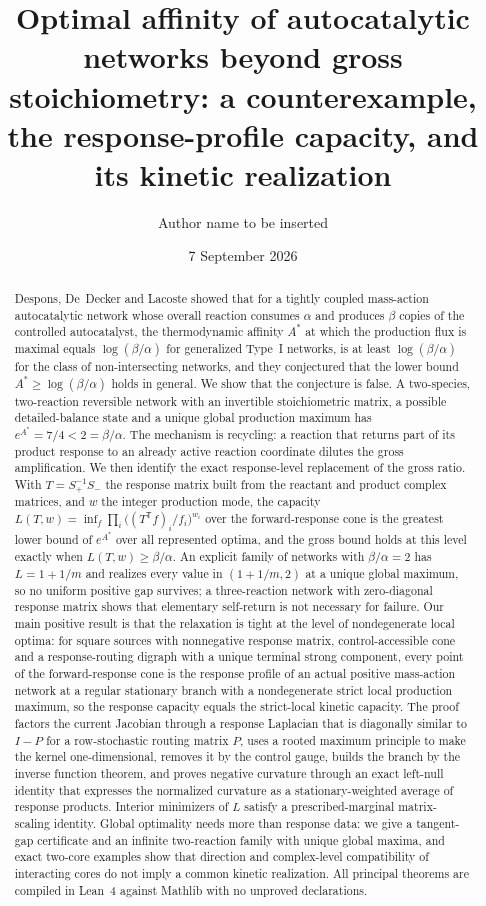 \documentclass[11pt,reqno]{amsart}
\title[Optimal affinity beyond gross stoichiometry]{Optimal affinity of autocatalytic networks beyond gross stoichiometry: a counterexample, the response-profile capacity, and its kinetic realization}
\author{Author name to be inserted}
\date{7 September 2026}
\theoremstyle{plain}
\theoremstyle{definition}
\theoremstyle{remark}
\numberwithin{equation}{section}
\newcommand{\Sp}{S_{+}}
\newcommand{\Sm}{S_{-}}
\newcommand{\T}{\mathsf{T}}
\begin{document}
\begin{abstract}
Despons, De~Decker and Lacoste showed that for a tightly coupled mass-action autocatalytic network whose overall reaction consumes $\alpha$ and produces $\beta$ copies of the controlled autocatalyst, the thermodynamic affinity $A^*$ at which the production flux is maximal equals $\log(\beta/\alpha)$ for generalized Type~I networks, is at least $\log(\beta/\alpha)$ for the class of non-intersecting networks, and they conjectured that the lower bound $A^*\ge\log(\beta/\alpha)$ holds in general.  We show that the conjecture is false.  A two-species, two-reaction reversible network with an invertible stoichiometric matrix, a possible detailed-balance state and a unique global production maximum has $e^{A^*}=7/4<2=\beta/\alpha$.  The mechanism is recycling: a reaction that returns part of its product response to an already active reaction coordinate dilutes the gross amplification.  We then identify the exact response-level replacement of the gross ratio.  With $T=\Sp^{-1}\Sm$ the response matrix built from the reactant and product complex matrices, and $w$ the integer production mode, the capacity $L(T,w)=\inf_f\prod_i\big((T^{\T}f)_i/f_i\big)^{w_i}$ over the forward-response cone is the greatest lower bound of $e^{A^*}$ over all represented optima, and the gross bound holds at this level exactly when $L(T,w)\ge\beta/\alpha$.  An explicit family of networks with $\beta/\alpha=2$ has $L=1+1/m$ and realizes every value in $(1+1/m,2)$ at a unique global maximum, so no uniform positive gap survives; a three-reaction network with zero-diagonal response matrix shows that elementary self-return is not necessary for failure.  Our main positive result is that the relaxation is tight at the level of nondegenerate local optima: for square sources with nonnegative response matrix, control-accessible cone and a response-routing digraph with a unique terminal strong component, every point of the forward-response cone is the response profile of an actual positive mass-action network at a regular stationary branch with a nondegenerate strict local production maximum, so the response capacity equals the strict-local kinetic capacity.  The proof factors the current Jacobian through a response Laplacian that is diagonally similar to $I-P$ for a row-stochastic routing matrix $P$, uses a rooted maximum principle to make the kernel one-dimensional, removes it by the control gauge, builds the branch by the inverse function theorem, and proves negative curvature through an exact left-null identity that expresses the normalized curvature as a stationary-weighted average of response products.  Interior minimizers of $L$ satisfy a prescribed-marginal matrix-scaling identity.  Global optimality needs more than response data: we give a tangent-gap certificate and an infinite two-reaction family with unique global maxima, and exact two-core examples show that direction and complex-level compatibility of interacting cores do not imply a common kinetic realization.  All principal theorems are compiled in Lean~4 against Mathlib with no unproved declarations.
\end{abstract}
\end{document}
